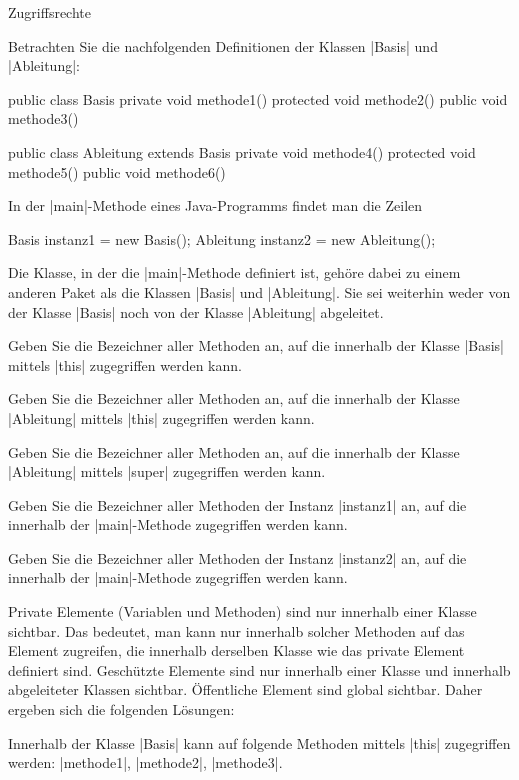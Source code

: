 \begin{exercise}{Zugriffsrechte}
\begin{body}
Betrachten Sie die nachfolgenden Definitionen der Klassen \code|Basis| und \code|Ableitung|:
\medskip
\begin{displaycode}
public class Basis {
    private void methode1() { }
    protected void methode2() { }
    public void methode3() { }
}
\end{displaycode}
\medskip
\begin{displaycode}
public class Ableitung extends Basis {
    private void methode4() { }
    protected void methode5() { }
    public void methode6() { }
}
\end{displaycode}
\medskip
In der \code|main|-Methode eines Java-Programms findet man die Zeilen
\medskip
\begin{displaycode}
    Basis instanz1 = new Basis();
    Ableitung instanz2 = new Ableitung();
\end{displaycode}
\medskip
Die Klasse, in der die \code|main|-Methode definiert ist, gehöre dabei zu einem anderen Paket als die Klassen \code|Basis| und \code|Ableitung|. Sie sei weiterhin weder von der Klasse \code|Basis| noch von der Klasse \code|Ableitung| abgeleitet.
\begin{parts}
\item
Geben Sie die Bezeichner aller Methoden an, auf die innerhalb der Klasse \code|Basis| mittels \code|this| zugegriffen werden kann.

\item
Geben Sie die Bezeichner aller Methoden an, auf die innerhalb der Klasse \code|Ableitung| mittels \code|this| zugegriffen werden kann.

\item
Geben Sie die Bezeichner aller Methoden an, auf die innerhalb der Klasse \code|Ableitung| mittels \code|super| zugegriffen werden kann.

\item
Geben Sie die Bezeichner aller Methoden der Instanz \code|instanz1| an, auf die innerhalb der \code|main|-Methode zugegriffen werden kann.

\item
Geben Sie die Bezeichner aller Methoden der Instanz \code|instanz2| an, auf die innerhalb der \code|main|-Methode zugegriffen werden kann.
\end{parts}
\end{body}


\begin{solution}
Private Elemente (Variablen und Methoden) sind nur innerhalb einer Klasse sichtbar. Das bedeutet, man kann nur innerhalb solcher Methoden auf das Element zugreifen, die innerhalb derselben Klasse wie das private Element definiert sind. Geschützte Elemente sind nur innerhalb einer Klasse und innerhalb abgeleiteter Klassen sichtbar. Öffentliche Element sind global sichtbar. Daher ergeben sich die folgenden Lösungen:
\begin{parts}
\item
Innerhalb der Klasse \code|Basis| kann auf folgende Methoden mittels \code|this| zugegriffen werden: \code|methode1|, \code|methode2|, \code|methode3|.


\end{parts}
\end{solution}
\end{exercise}
